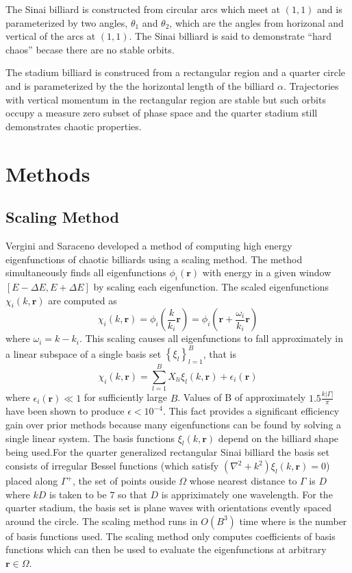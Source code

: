 \documentclass{report}
\newcommand{\rr}[0]{\mathbf{r}}
\begin{document}
The Sinai billiard is constructed from circular arcs which meet at $(1,1)$ and is parameterized by two angles, $\theta_{1}$ and $\theta_{2}$, which are the angles from horizonal and vertical of the arcs at $(1,1)$. The Sinai billiard is said to demonstrate ``hard chaos'' becase there are no stable orbits.

The stadium billiard is construced from a rectangular region and a quarter circle and is parameterized by the the horizontal length of the billiard $\alpha$. Trajectories with vertical momentum in the rectangular region are stable but such orbits occupy a measure zero subset of phase space and the quarter stadium still demonstrates chaotic properties.


\chapter{Methods}
\section{Scaling Method}
Vergini and Saraceno \cite{vergini} developed a method of computing high energy eigenfunctions of chaotic billiards using a scaling method. The method simultaneously finds all eigenfunctions $\phi_{i}(\rr)$ with energy in a given window $[E - \Delta E, E + \Delta E]$ by scaling each eigenfunction. The scaled eigenfunctions $\chi_{i}(k, \rr)$ are computed as
\[
\chi_{i}(k, \rr) = \phi_{i} \left( \frac{k}{k_{i}} \rr \right) = \phi_{i} \left( \rr + \frac{\omega_{i}}{k_i} \rr \right)
\]
where $\omega_{i} = k - k_i$. This scaling causes all eigenfunctions to fall approximately in a linear subspace of a single basis set $\left\{ \xi_{l} \right\}_{l=1}^{B}$, that is
\[
\chi_{i}(k, \rr) = \sum_{l=1}^{B} X_{li} \xi_{l}(k, \rr) + \epsilon_{i}(\rr)
\]
where $\epsilon_{i}(\rr) \ll 1$ for sufficiently large $B$. Values of B of approximately $1.5 \frac{k \vert \Gamma \vert}{\pi}$ have been shown to produce $\epsilon < 10^{-4}$. This fact provides a significant efficiency gain over prior methods because many eigenfunctions can be found by solving a single linear system. The basis functions $\xi_{l}(k, \rr)$ depend on the billiard shape being used.For the quarter generalized rectangular Sinai billiard the basis set consists of irregular Bessel functions (which satisfy $(\nabla^{2} + k^2)\xi_{l}(k, \rr) = 0$) placed along $\Gamma^{+}$, the set of points ouside $\Omega$ whose nearest distance to $\Gamma$ is $D$ where $kD$ is taken to be $7$ so that $D$ is appriximately one wavelength. For the quarter stadium, the basis set is plane waves with orientations evently spaced around the circle. The scaling method runs in $O(B^{3})$ time where  is the number of basis functions used. The scaling method only computes coefficients of basis functions which can then be used to evaluate the eigenfunctions at arbitrary $\rr \in \Omega$. \cite{barnett}
\end{document}
